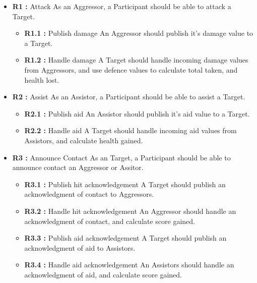 \begin{itemize}
\item \textbf{R1 :} Attack
\newline
As an Aggressor, a Participant should be able to attack a Target.
\begin{itemize}
\item \textbf{R1.1 :} Publish damage
\newline
An Aggressor should publish it's damage value to a Target.
\item \textbf{R1.2 :} Handle damage
\newline
A Target should handle incoming damage values from Aggressors, and use defence values to calculate total taken, and health lost.
\end{itemize}
\item \textbf{R2 :} Assist
\newline
As an Assistor, a Participant should be able to assist a Target.
\begin{itemize}
\item \textbf{R2.1 :} Publish aid
\newline
An Assistor should publish it's aid value to a Target.
\item \textbf{R2.2 :} Handle aid
\newline
A Target should handle incoming aid values from Assistors, and calculate health gained.
\end{itemize}
\item \textbf{R3 :} Announce Contact
\newline
As an Target, a Participant should be able to announce contact an Aggressor or Assitor.
\begin{itemize}
\item \textbf{R3.1 :} Publish hit acknowledgement 
\newline
A Target should publish an acknowledgment of contact to Aggressors.
\item \textbf{R3.2 :} Handle hit acknowledgement
\newline
An Aggressor should handle an acknowledgment of contact, and calculate score gained.
\item \textbf{R3.3 :} Publish aid acknowledgement
\newline
A Target should publish an acknowledgment of aid to Assistors.
\item \textbf{R3.4 :} Handle aid acknowledgement
\newline
An Assistors should handle an acknowledgment of aid, and calculate score gained.
\end{itemize}
\end{itemize}

